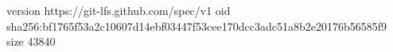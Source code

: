 version https://git-lfs.github.com/spec/v1
oid sha256:bf1765f53a2c10607d14ebf03447f53cee170dcc3adc51a8b2e20176b56585f9
size 43840
